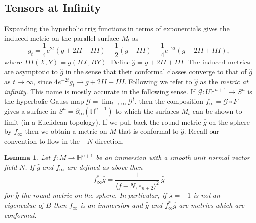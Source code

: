 \documentclass{amsart}
\newcommand{\two}{I\!\!I}
\newcommand{\three}{I\!\!I\!\!I}
\newtheorem{lem}[thm]{Lemma}
\numberwithin{equation}{section}
\renewcommand{\H}{\mathbb{H}}
\begin{document}
\subsection{Tensors at Infinity}

Expanding the hyperbolic trig functions in terms of exponentials gives the induced metric on the parallel surface $M_t$ as 
\[
g_t = \frac{1}{4}e^{2t}(g + 2\two + \three) + \frac{1}{2}(g - \three) + \frac{1}{4}e^{-2t}(g - 2\two + \three),
\]
where $\three(X,Y) = g(BX,BY)$.
Define $\hat{g} = g + 2\two + \three$.
The induced metrics are asymptotic to $\hat{g}$ in the sense that their conformal classes converge to that of $\hat{g}$ as $t \to \infty$, since $4e^{-2t}g_t \to g + 2\two + \three$.
Following \cite{Krasnov-Schlenker2008} we refer to $\hat{g}$ as the \emph{metric at infinity}.
This name is mostly accurate in the following sense. 
If $\mathcal{G}: U\H^{n+1} \to S^n$ is the hyperbolic Gauss map $\mathcal{G} = \lim_{t \to \infty} \mathcal{G}^t$, then the composition $f_\infty = \mathcal{G} \circ F$ gives a
surface in $S^n = \partial_\infty(\H^{n+1})$ to which the surfaces $M_t$ can be shown to limit (in a Euclidean topology). 
If we pull back the round metric $\overset{\circ}{g}$ on the sphere by $f_\infty$ then we obtain a metric on $M$ that is conformal to $\hat{g}$.
Recall our convention to flow in the $-N$ direction.

\begin{lem}
\label{HypGaussMap}
Let $f: M \to \H^{n+1}$ be an immersion with a smooth unit normal vector field $N$. If $\hat{g}$ and $f_\infty$ are defined as above then 
\[
f^*_\infty \overset{\circ}{g} = \frac{1}{\langle f - N, e_{n+2}\rangle^2} \ \hat{g}
\]
for $\overset{\circ}{g}$ the round metric on the sphere.
In particular, if $\lambda =-1$ is not an eigenvalue of $B$ then $f_\infty$ is an immersion and $\hat{g}$ and $f_\infty^*\overset{\circ}{g}$ are metrics which are conformal.
\end{lem}
\end{document}
